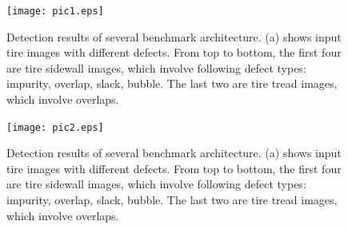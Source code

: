 \documentclass{article}
\begin{document}
\begin{figure}[t]
  \centering
  \centerline{\texttt{[image: pic1.eps]}}
  \caption{Detection results of several benchmark architecture. (a) shows input tire images with different defects. From top to bottom, the first four are tire sidewall images, which involve following defect types: impurity, overlap, slack, bubble. The last two are tire tread images, which involve overlaps. }
\end{figure}


\begin{figure}[t]
  \centering
  \centerline{\texttt{[image: pic2.eps]}}
  \caption{Detection results of several benchmark architecture. (a) shows input tire images with different defects. From top to bottom, the first four are tire sidewall images, which involve following defect types: impurity, overlap, slack, bubble. The last two are tire tread images, which involve overlaps. }
\end{figure}
\end{document}
